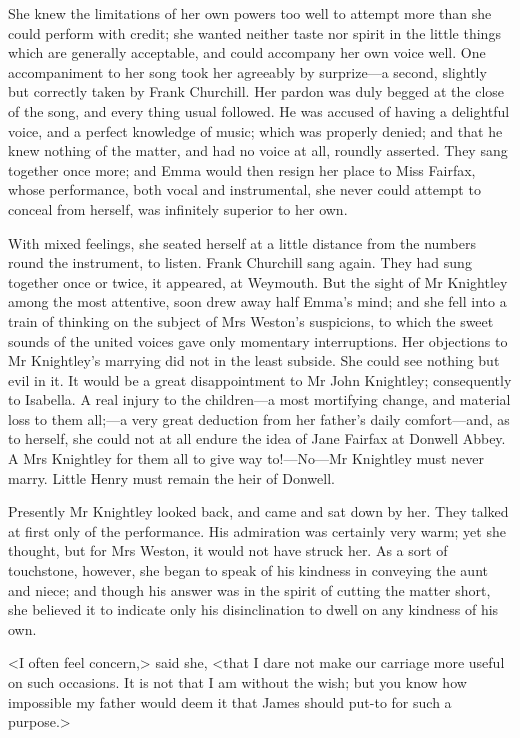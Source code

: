 She knew the limitations of her own powers too well to attempt more than she could perform with credit; she wanted neither taste nor spirit in the little things which are generally acceptable, and could accompany her own voice well. One accompaniment to her song took her agreeably by surprize—a second, slightly but correctly taken by Frank Churchill. Her pardon was duly begged at the close of the song, and every thing usual followed. He was accused of having a delightful voice, and a perfect knowledge of music; which was properly denied; and that he knew nothing of the matter, and had no voice at all, roundly asserted. They sang together once more; and Emma would then resign her place to Miss Fairfax, whose performance, both vocal and instrumental, she never could attempt to conceal from herself, was infinitely superior to her own.

With mixed feelings, she seated herself at a little distance from the numbers round the instrument, to listen. Frank Churchill sang again. They had sung together once or twice, it appeared, at Weymouth. But the sight of Mr Knightley among the most attentive, soon drew away half Emma's mind; and she fell into a train of thinking on the subject of Mrs Weston's suspicions, to which the sweet sounds of the united voices gave only momentary interruptions. Her objections to Mr Knightley's marrying did not in the least subside. She could see nothing but evil in it. It would be a great disappointment to Mr John Knightley; consequently to Isabella. A real injury to the children—a most mortifying change, and material loss to them all;—a very great deduction from her father's daily comfort—and, as to herself, she could not at all endure the idea of Jane Fairfax at Donwell Abbey. A Mrs Knightley for them all to give way to!—No—Mr Knightley must never marry. Little Henry must remain the heir of Donwell.

Presently Mr Knightley looked back, and came and sat down by her. They talked at first only of the performance. His admiration was certainly very warm; yet she thought, but for Mrs Weston, it would not have struck her. As a sort of touchstone, however, she began to speak of his kindness in conveying the aunt and niece; and though his answer was in the spirit of cutting the matter short, she believed it to indicate only his disinclination to dwell on any kindness of his own.

<I often feel concern,> said she, <that I dare not make our carriage more useful on such occasions. It is not that I am without the wish; but you know how impossible my father would deem it that James should put-to for such a purpose.>

